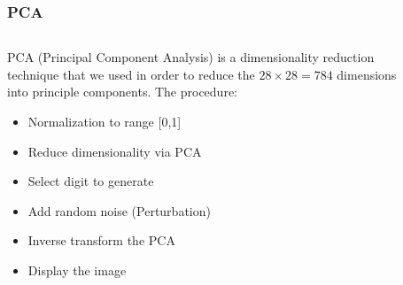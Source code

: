 \begin{frame}
    \frametitle{PCA}
    \begin{columns}
        \begin{column}{0.7\textwidth}
            PCA (Principal Component Analysis) is a dimensionality reduction technique that we
            used in order to reduce the $28 \times 28=784$ dimensions into principle components.
            The procedure:
            \begin{itemize}
                \item Normalization to range [0,1]
                \item Reduce dimensionality via PCA
                \item Select digit to generate
                \item Add random noise (Perturbation)
                \item Inverse transform the PCA
                \item Display the image
            \end{itemize}
        \end{column}
        \begin{column}{0.3\textwidth}
            \begin{figure}
                \centering

\end{figure}
\end{column}
\end{columns}
\end{frame}
